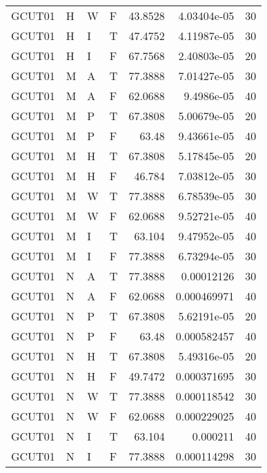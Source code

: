 \begin{table}[htb!]
{\begin{tabular}{llllrrr}
            GCUT01   & H     & W     & F          & 43.8528    & 4.03404e-05 & 30       \\
            GCUT01   & H     & I     & T          & 47.4752    & 4.11987e-05 & 30       \\
            GCUT01   & H     & I     & F          & 67.7568    & 2.40803e-05 & 20       \\
            GCUT01   & M     & A     & T          & 77.3888    & 7.01427e-05 & 30       \\
            GCUT01   & M     & A     & F          & 62.0688    & 9.4986e-05  & 40       \\
            GCUT01   & M     & P     & T          & 67.3808    & 5.00679e-05 & 20       \\
            GCUT01   & M     & P     & F          & 63.48      & 9.43661e-05 & 40       \\
            GCUT01   & M     & H     & T          & 67.3808    & 5.17845e-05 & 20       \\
            GCUT01   & M     & H     & F          & 46.784     & 7.03812e-05 & 30       \\
            GCUT01   & M     & W     & T          & 77.3888    & 6.78539e-05 & 30       \\
            GCUT01   & M     & W     & F          & 62.0688    & 9.52721e-05 & 40       \\
            GCUT01   & M     & I     & T          & 63.104     & 9.47952e-05 & 40       \\
            GCUT01   & M     & I     & F          & 77.3888    & 6.73294e-05 & 30       \\
            GCUT01   & N     & A     & T          & 77.3888    & 0.00012126  & 30       \\
            GCUT01   & N     & A     & F          & 62.0688    & 0.000469971 & 40       \\
            GCUT01   & N     & P     & T          & 67.3808    & 5.62191e-05 & 20       \\
            GCUT01   & N     & P     & F          & 63.48      & 0.000582457 & 40       \\
            GCUT01   & N     & H     & T          & 67.3808    & 5.49316e-05 & 20       \\
            GCUT01   & N     & H     & F          & 49.7472    & 0.000371695 & 30       \\
            GCUT01   & N     & W     & T          & 77.3888    & 0.000118542 & 30       \\
            GCUT01   & N     & W     & F          & 62.0688    & 0.000229025 & 40       \\
            GCUT01   & N     & I     & T          & 63.104     & 0.000211    & 40       \\
            GCUT01   & N     & I     & F          & 77.3888    & 0.000114298 & 30       \\
            \hline
        \end{tabular}
    }{
    }
\end{table} 

